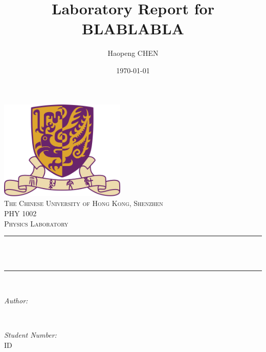 \title{Laboratory Report for BLABLABLA} %
\author{Haopeng CHEN}%
\date{\today}%




\begin{titlepage}
    \centering
    \vspace*{0.5 cm}
    \includegraphics[scale = 0.75,width=6cm]{CUHK}\\[1.0 cm]   %
    \textsc{\large The Chinese University of Hong Kong, Shenzhen}\\[2.0 cm] 
    \textsc{\Large PHY 1002}\\[0.5 cm] 
    \textsc{\large Physics Laboratory}\\[0.5 cm]               %
    \rule{\linewidth}{0.2 mm} \\[0.4 cm]
    { \huge \bfseries \thetitle}\\
    \rule{\linewidth}{0.2 mm} \\[1.5 cm]
    
    \begin{minipage}{0.4\textwidth}
        \begin{flushleft} \large
            \emph{Author:}\\
            \theauthor
            \end{flushleft}
    \end{minipage}~
    \begin{minipage}{0.4\textwidth}
            \begin{flushright} \large
            \emph{Student Number:} \\
            ID  %
        \end{flushright}
    \end{minipage}\\[2 cm]
    {\large \thedate}\\[2 cm]
 
    \vfill
    
\end{titlepage}

